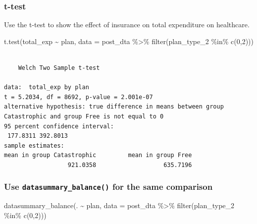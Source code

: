 \documentclass[
  letterpaper,
  DIV=11,
  numbers=noendperiod]{scrartcl}
\newenvironment{Shaded}{\begin{snugshade}}{\end{snugshade}}
\newcommand{\AttributeTok}[1]{\textcolor[rgb]{0.40,0.45,0.13}{#1}}
\newcommand{\DecValTok}[1]{\textcolor[rgb]{0.68,0.00,0.00}{#1}}
\newcommand{\FunctionTok}[1]{\textcolor[rgb]{0.28,0.35,0.67}{#1}}
\newcommand{\NormalTok}[1]{\textcolor[rgb]{0.00,0.23,0.31}{#1}}
\newcommand{\SpecialCharTok}[1]{\textcolor[rgb]{0.37,0.37,0.37}{#1}}
\begin{document}
\hypertarget{t-test}{%
\subsubsection{t-test}\label{t-test}}

Use the t-test to show the effect of insurance on total expenditure on
healthcare.

\begin{Shaded}
\begin{Highlighting}[]
\FunctionTok{t.test}\NormalTok{(total\_exp }\SpecialCharTok{\textasciitilde{}}\NormalTok{ plan, }\AttributeTok{data =}\NormalTok{ post\_dta }\SpecialCharTok{\%\textgreater{}\%} \FunctionTok{filter}\NormalTok{(plan\_type\_2 }\SpecialCharTok{\%in\%} \FunctionTok{c}\NormalTok{(}\DecValTok{0}\NormalTok{,}\DecValTok{2}\NormalTok{)))}
\end{Highlighting}
\end{Shaded}

\begin{verbatim}

    Welch Two Sample t-test

data:  total_exp by plan
t = 5.2034, df = 8692, p-value = 2.001e-07
alternative hypothesis: true difference in means between group Catastrophic and group Free is not equal to 0
95 percent confidence interval:
 177.8311 392.8013
sample estimates:
mean in group Catastrophic         mean in group Free 
                  921.0358                   635.7196 
\end{verbatim}

\hypertarget{use-datasummary_balance-for-the-same-comparison}{%
\subsubsection{\texorpdfstring{Use \texttt{datasummary\_balance()} for
the same
comparison}{Use datasummary\_balance() for the same comparison}}\label{use-datasummary_balance-for-the-same-comparison}}

\begin{Shaded}
\begin{Highlighting}[]
\FunctionTok{datasummary\_balance}\NormalTok{(. }\SpecialCharTok{\textasciitilde{}}\NormalTok{ plan, }\AttributeTok{data =}\NormalTok{ post\_dta }\SpecialCharTok{\%\textgreater{}\%} \FunctionTok{filter}\NormalTok{(plan\_type\_2 }\SpecialCharTok{\%in\%} \FunctionTok{c}\NormalTok{(}\DecValTok{0}\NormalTok{,}\DecValTok{2}\NormalTok{)))}
\end{Highlighting}
\end{Shaded}
\end{document}

